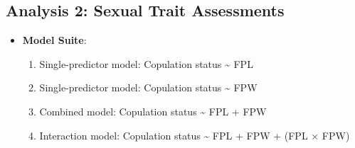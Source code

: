 \documentclass[
]{article}
\providecommand{\tightlist}{%
  \setlength{\itemsep}{0pt}\setlength{\parskip}{0pt}}
\begin{document}
\hypertarget{analysis-2-sexual-trait-assessments}{%
\subsection{Analysis 2: Sexual Trait
Assessments}\label{analysis-2-sexual-trait-assessments}}

\begin{itemize}
\tightlist
\item
  \textbf{Model Suite}:

  \begin{enumerate}
  \def\labelenumi{\arabic{enumi}.}
  \tightlist
  \item
    Single-predictor model: Copulation status \textasciitilde{} FPL
  \item
    Single-predictor model: Copulation status \textasciitilde{} FPW
  \item
    Combined model: Copulation status \textasciitilde{} FPL + FPW
  \item
    Interaction model: Copulation status \textasciitilde{} FPL + FPW +
    (FPL × FPW)
  \end{enumerate}
\end{itemize}
\end{document}
